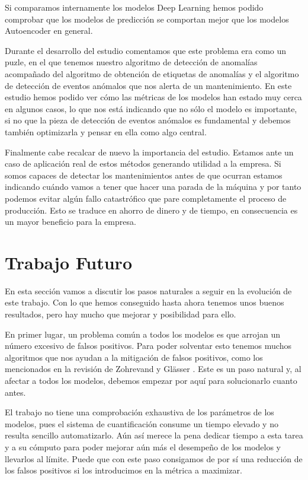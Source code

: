 Si comparamos internamente los modelos Deep Learning hemos podido comprobar que los modelos de predicción se comportan mejor que los modelos Autoencoder en general. 

Durante el desarrollo del estudio comentamos que este problema era como un puzle, en el que tenemos nuestro algoritmo de detección de anomalías acompañado del algoritmo de obtención de etiquetas de anomalías y el algoritmo de detección de eventos anómalos que nos alerta de un mantenimiento. En este estudio hemos podido ver cómo las métricas de los modelos han estado muy cerca en algunos casos, lo que nos está indicando que no sólo el modelo es importante, si no que la pieza de detección de eventos anómalos es fundamental y debemos también optimizarla y pensar en ella como algo central.

Finalmente cabe recalcar de nuevo la importancia del estudio. Estamos ante un caso de aplicación real de estos métodos generando utilidad a la empresa. Si somos capaces de detectar los mantenimientos antes de que ocurran estamos indicando cuándo vamos a tener que hacer una parada de la máquina y por tanto podemos evitar algún fallo catastrófico que pare completamente el proceso de producción. Esto se traduce en ahorro de dinero y de tiempo, en consecuencia es un mayor beneficio para la empresa.

\section{Trabajo Futuro}

En esta sección vamos a discutir los pasos naturales a seguir en la evolución de este trabajo. Con lo que hemos conseguido hasta ahora tenemos unos buenos resultados, pero hay mucho que mejorar y posibilidad para ello.

En primer lugar, un problema común a todos los modelos es que arrojan un número excesivo de falsos positivos. Para poder solventar esto tenemos muchos algoritmos que nos ayudan a la mitigación de falsos positivos, como los mencionados en la revisión de Zohrevand y Glässer \cite{zahra_should_2019}. Este es un paso natural y, al afectar a todos los modelos, debemos empezar por aquí para solucionarlo cuanto antes.

El trabajo no tiene una comprobación exhaustiva de los parámetros de los modelos, pues el sistema de cuantificación consume un tiempo elevado y no resulta sencillo automatizarlo. Aún así merece la pena dedicar tiempo a esta tarea y a su cómputo para poder mejorar aún más el desempeño de los modelos y llevarlos al límite. Puede que con este paso consigamos de por sí una reducción de los falsos positivos si los introducimos en la métrica a maximizar.

